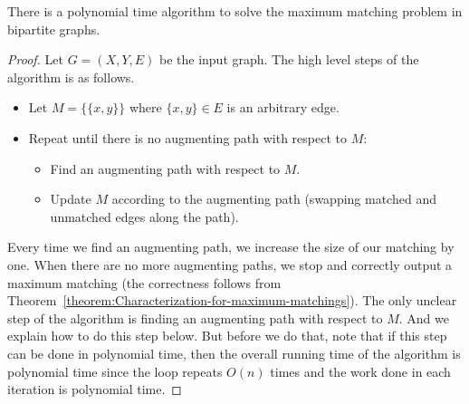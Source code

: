 \begin{flex}
\label{grp:theorem:Finding-a-maximum-matching-in-bipartite-graphs}

\begin{theorem}
\label{theorem:Finding-a-maximum-matching-in-bipartite-graphs}
There is a polynomial time algorithm to solve the maximum matching problem in bipartite graphs.

\end{theorem}

\begin{proof}
\label{prf:matchings-in-graphs::input}
Let $G=(X,Y,E)$ be the input graph. The high level steps of the algorithm is as follows.
\begin{itemize}
    \item Let $M = \{ \{x,y\} \}$ where $\{x,y\} \in E$ is an arbitrary edge.
    \item Repeat until there is no augmenting path with respect to $M$:
    \begin{itemize}
        \item Find an augmenting path with respect to $M$.
        \item Update $M$ according to the augmenting path (swapping matched and unmatched edges along the path).
    \end{itemize}
\end{itemize}
Every time we find an augmenting path, we increase the size of our matching by one. When there are no more augmenting paths, we stop and correctly output a maximum matching (the correctness follows from Theorem~\ref{theorem:Characterization-for-maximum-matchings}). The only unclear step of the algorithm is finding an augmenting path with respect to $M$. And we explain how to do this step below. But before we do that, note that if this step can be done in polynomial time, then the overall running time of the algorithm is polynomial time since the loop repeats $O(n)$ times and the work done in each iteration is polynomial time. 


\end{proof}
\end{flex}
